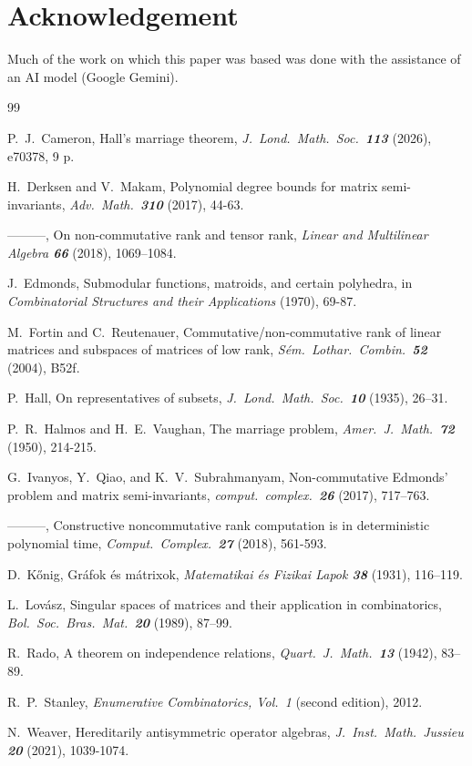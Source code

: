 \documentclass{amsart}
\theoremstyle{definition}
\begin{document}
\section*{Acknowledgement}

Much of the work on which this paper was based was done with the assistance of an AI model (Google Gemini).


\begin{thebibliography}{99}

P.\ J.\ Cameron, Hall's marriage theorem, {\it J.\ Lond.\ Math.\ Soc.\ \bf 113} (2026), e70378, 9 p.

H.\ Derksen and V.\ Makam, Polynomial degree bounds for matrix
semi-invariants, {\it Adv.\ Math.\ \bf 310} (2017), 44-63.

{---------}, On non-commutative rank and tensor rank, {\it Linear and Multilinear Algebra \bf 66} (2018), 1069–1084.

J.\ Edmonds, Submodular functions, matroids, and certain polyhedra, in {\it Combinatorial
Structures and their Applications} (1970), 69-87.

M.\ Fortin and C.\ Reutenauer, Commutative/non-commutative rank of linear matrices and subspaces of
matrices of low rank, {\it S\'{e}m.\ Lothar.\ Combin.\ \bf 52} (2004), B52f.

P.\ Hall, On representatives of subsets, {\it J.\ Lond.\ Math.\ Soc.\ \bf 10} (1935), 26–31.

P.\ R.\ Halmos and H.\ E.\ Vaughan, The marriage problem, {\it Amer.\ J.\ Math.\ \bf 72} (1950), 214-215.

G.\ Ivanyos, Y.\ Qiao, and K.\ V.\ Subrahmanyam, Non-commutative Edmonds’ problem and matrix semi-invariants, {\it comput.\ complex.\ \bf 26} (2017), 717–763.

{---------}, Constructive noncommutative rank computation is in deterministic polynomial time, {\it Comput.\ Complex.\ \bf 27} (2018), 561-593.

D.\ Kőnig, Gráfok és mátrixok, {\it Matematikai és Fizikai Lapok \bf 38} (1931), 116–119.

L.\ Lovász, Singular spaces of matrices and their application in combinatorics, {\it Bol.\ Soc.\ Bras.\ Mat.\ \bf 20} (1989), 87–99.

R.\ Rado, A theorem on independence relations, {\it Quart.\ J.\ Math.\ \bf 13} (1942), 83–89.

R.\ P.\ Stanley, {\it Enumerative Combinatorics, Vol.\ 1} (second edition), 2012.

N.\ Weaver, Hereditarily antisymmetric operator algebras, {\it J.\ Inst.\ Math.\ Jussieu \bf 20} (2021), 1039-1074.

\end{thebibliography}
\end{document}
